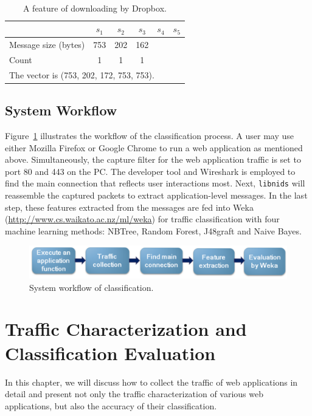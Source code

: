 \documentclass[preprint,12pt]{elsarticle}
\begin{document}
\
\begin{table}[H]
\centering
\caption{A feature of downloading by Dropbox.}
\begin{tabular}{|l|c|c|c|c|c|}

\hline  & $s_1$ & $s_2$ & $s_3$ & $s_4$ & $s_5$ \\
\hline
\hline Message size (bytes) & 753 & 202 & 162 &  &\\
\hline Count & 1 & 1 & 1 &  &\\
\hline
\multicolumn{6}{l}{The vector is (753, 202, 172, 753, 753).}\\ 
\end{tabular}
\label{table:fill_same}
\end{table}


\subsection{System Workflow}
\label{sec:system}
Figure~\ref{Fig.system} illustrates the workflow of the classification process. A user may use either Mozilla Firefox or Google Chrome to run a web application as mentioned above. Simultaneously, the capture filter for the web application traffic is set to port 80 and 443 on the PC. The developer tool and Wireshark is employed to find the main connection that reflects user interactions most. Next, \texttt{libnids} will reassemble the captured packets to extract application-level messages. In the last step, these features extracted from the messages are fed into Weka (\url{http://www.cs.waikato.ac.nz/ml/weka}) for traffic classification with four machine learning methods: NBTree, Random Forest, J48graft and Naive Bayes.


\begin{figure}[H]
\begin{center} 
\includegraphics[width=1.0\textwidth]{workflow}
\end{center}
\caption{System workflow of classification.}
\label{Fig.system}
\end{figure}

\section{Traffic Characterization and Classification Evaluation}
\label{sec:evaluation}
In this chapter, we will discuss how to collect the traffic of web applications in detail and present not only the traffic characterization of various web applications, but also the accuracy of their classification.
\end{document}
